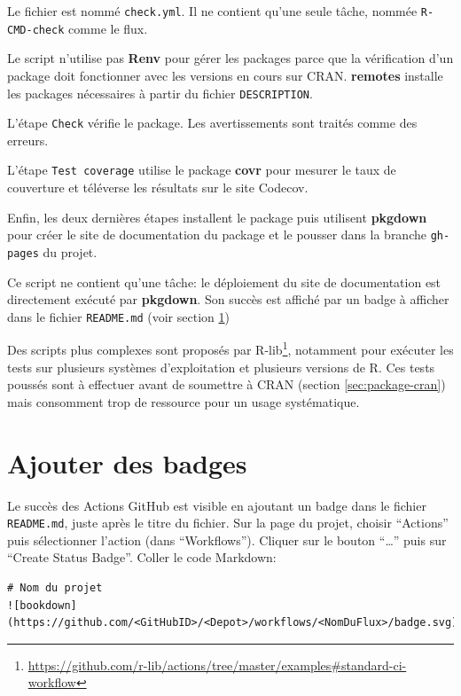 \documentclass[
  12pt,
  french,
  a4paper,
  extrafontsizes,onecolumn,openright
  ]{memoir}
\begin{document}
Le fichier est nommé \texttt{check.yml}.
Il ne contient qu'une seule tâche, nommée \texttt{R-CMD-check} comme le flux.

Le script n'utilise pas \textbf{Renv} pour gérer les packages parce que la vérification d'un package doit fonctionner avec les versions en cours sur CRAN.
\textbf{remotes} installe les packages nécessaires à partir du fichier \texttt{DESCRIPTION}.

L'étape \texttt{Check} vérifie le package.
Les avertissements sont traités comme des erreurs.

L'étape \texttt{Test\ coverage} utilise le package \textbf{covr} pour mesurer le taux de couverture et téléverse les résultats sur le site Codecov.

Enfin, les deux dernières étapes installent le package puis utilisent \textbf{pkgdown} pour créer le site de documentation du package et le pousser dans la branche \texttt{gh-pages} du projet.

Ce script ne contient qu'une tâche: le déploiement du site de documentation est directement exécuté par \textbf{pkgdown}.
Son succès est affiché par un badge à afficher dans le fichier \texttt{README.md} (voir section \ref{sec:ci-badges})

Des scripts plus complexes sont proposés par R-lib\footnote{\url{https://github.com/r-lib/actions/tree/master/examples\#standard-ci-workflow}}, notamment pour exécuter les tests sur plusieurs systèmes d'exploitation et plusieurs versions de R.
Ces tests poussés sont à effectuer avant de soumettre à CRAN (section \ref{sec:package-cran}) mais consomment trop de ressource pour un usage systématique.

\hypertarget{sec:ci-badges}{%
\section{Ajouter des badges}\label{sec:ci-badges}}

Le succès des Actions GitHub est visible en ajoutant un badge dans le fichier \texttt{README.md}, juste après le titre du fichier.
Sur la page du projet, choisir \enquote{Actions} puis sélectionner l'action (dans \enquote{Workflows}).
Cliquer sur le bouton \enquote{\ldots{}} puis sur \enquote{Create Status Badge}.
Coller le code Markdown:

\begin{verbatim}
# Nom du projet
![bookdown](https://github.com/<GitHubID>/<Depot>/workflows/<NomDuFlux>/badge.svg)
\end{verbatim}
\end{document}
